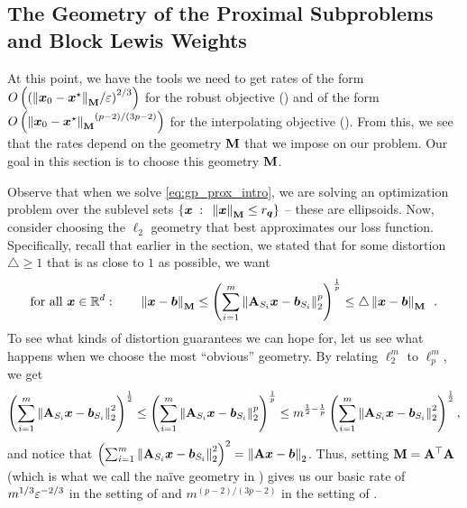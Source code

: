 \subsection{The Geometry of the Proximal Subproblems and Block Lewis Weights}
\label{sec:gp_reg_overview_blw}

At this point, we have the tools we need to get rates of the form $O\left(\left({\left\lVert \bm{x}_0-\bm{x}^{\star} \right\rVert_{\mathbf{M}}}/{\varepsilon}\right)^{2/3}\right)$ for the robust objective () and of the form $O\left({\left\lVert \bm{x}_0-\bm{x}^{\star} \right\rVert_{\mathbf{M}}}^{(p-2)/(3p-2)}\right)$ for the interpolating objective (). From this, we see that the rates depend on the geometry $\mathbf{M}$ that we impose on our problem. Our goal in this section is to choose this geometry $\mathbf{M}$.

Observe that when we solve \eqref{eq:gp_prox_intro}, we are solving an optimization problem over the sublevel sets $\left\{\bm{x}{\;\; : \;\;} \left\lVert \bm{x} \right\rVert_{\mathbf{M}}\le r_{\bm{q}}\right\}$ -- these are ellipsoids. Now, consider choosing the $\ell_2$ geometry that best approximates our loss function. Specifically, recall that earlier in the section, we stated that for some distortion $\triangle \ge 1$ that is as close to $1$ as possible, we want
\begin{align*}
    \text{for all } \bm{x} \in \mathbb{R}^d:\quad\quad \left\lVert \bm{x} - \bm{b} \right\rVert_{\mathbf{M}} \le \left(\sum_{i=1}^m \left\lVert \mathbf{A}_{S_i}\bm{x}-\bm{b}_{S_i} \right\rVert_2^p\right)^{\frac{1}{p}} \le \triangle\left\lVert \bm{x} -\bm{b} \right\rVert_{\mathbf{M}}\enspace.
\end{align*}
To see what kinds of distortion guarantees we can hope for, let us see what happens when we choose the most ``obvious'' geometry. By relating $\ell_2^m$ to $\ell_p^m$, we get
\begin{align*}
    \left(\sum_{i=1}^m \left\lVert \mathbf{A}_{S_i}\bm{x}-\bm{b}_{S_i} \right\rVert_2^2\right)^{\frac{1}{2}} \le \left(\sum_{i=1}^m \left\lVert \mathbf{A}_{S_i}\bm{x}-\bm{b}_{S_i} \right\rVert_2^p\right)^{\frac{1}{p}} \le m^{\frac{1}{2}-\frac{1}{p}}\left(\sum_{i=1}^m \left\lVert \mathbf{A}_{S_i}\bm{x}-\bm{b}_{S_i} \right\rVert_2^2\right)^{\frac{1}{2}},
\end{align*}
and notice that $\left(\sum_{i=1}^m \left\lVert \mathbf{A}_{S_i}\bm{x}-\bm{b}_{S_i} \right\rVert_2^2\right)^2 = \left\lVert \mathbf{A}\bm{x}-\bm{b} \right\rVert_2$. Thus, setting $\mathbf{M} = \mathbf{A}^{\top}\mathbf{A}$ (which is what we call the na\"ive geometry in ) gives us our basic rate of $m^{1/3}\varepsilon^{-2/3}$ in the setting of  and $m^{(p-2)/(3p-2)}$ in the setting of .

